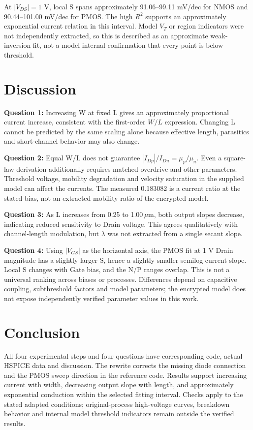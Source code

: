 At $|V_{DS}|=1$ V, local S spans approximately 91.06--99.11 mV/dec for NMOS and 90.44--101.00 mV/dec for PMOS. The high $R^2$ supports an approximately exponential current relation in this interval. Model $V_T$ or region indicators were not independently extracted, so this is described as an approximate weak-inversion fit, not a model-internal confirmation that every point is below threshold.

\section{Discussion}
\textbf{Question 1:} Increasing W at fixed L gives an approximately proportional current increase, consistent with the first-order $W/L$ expression. Changing L cannot be predicted by the same scaling alone because effective length, parasitics and short-channel behavior may also change.

\textbf{Question 2:} Equal W/L does not guarantee $|I_{Dp}|/I_{Dn}=\mu_p/\mu_n$. Even a square-law derivation additionally requires matched overdrive and other parameters. Threshold voltage, mobility degradation and velocity saturation in the supplied model can affect the currents. The measured 0.183082 is a current ratio at the stated bias, not an extracted mobility ratio of the encrypted model.

\textbf{Question 3:} As L increases from 0.25 to 1.00\,$\mu$m, both output slopes decrease, indicating reduced sensitivity to Drain voltage. This agrees qualitatively with channel-length modulation, but $\lambda$ was not extracted from a single secant slope.

\textbf{Question 4:} Using $|V_{GS}|$ as the horizontal axis, the PMOS fit at 1 V Drain magnitude has a slightly larger S, hence a slightly smaller semilog current slope. Local S changes with Gate bias, and the N/P ranges overlap. This is not a universal ranking across biases or processes. Differences depend on capacitive coupling, subthreshold factors and model parameters; the encrypted model does not expose independently verified parameter values in this work.

\section{Conclusion}
All four experimental steps and four questions have corresponding code, actual HSPICE data and discussion. The rewrite corrects the missing diode connection and the PMOS sweep direction in the reference code. Results support increasing current with width, decreasing output slope with length, and approximately exponential conduction within the selected fitting interval. Checks apply to the stated adapted conditions; original-process high-voltage curves, breakdown behavior and internal model threshold indicators remain outside the verified results.
